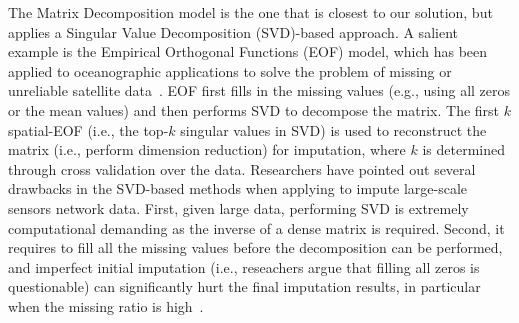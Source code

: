 The Matrix Decomposition model is the one that is closest to our
solution, but applies a Singular Value Decomposition (SVD)-based
approach.  A salient example is the Empirical Orthogonal Functions
(EOF) model, which has been applied to oceanographic applications to
solve the problem of missing or unreliable satellite
data~\cite{beckers2003eof}.  EOF first fills in the missing values
(e.g., using all zeros or the mean values) and then performs SVD to
decompose the matrix. The first $k$ spatial-EOF (i.e., the top-$k$
singular values in SVD) is used to reconstruct the matrix (i.e.,
perform dimension reduction) for imputation, where $k$ is determined
through cross validation over the data.  Researchers have pointed out
several drawbacks in the SVD-based methods when applying to impute
large-scale sensors network data. First, given large data, performing
SVD is extremely computational demanding as the inverse of a dense
matrix is required. Second, it requires to fill all the missing values
before the decomposition can be performed, and imperfect initial
imputation (i.e., reseachers argue that filling all zeros is
questionable) can significantly hurt the final imputation results, in
particular when the missing ratio is
high~\cite{koren2009matrix,ke2005robust}.

  
